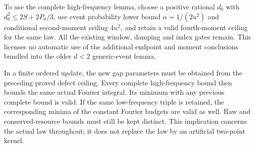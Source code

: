 To use the complete high-frequency lemma, choose a positive rational
$d_0$ with $d_0^2\le2S+2P_0/3$, use event probability lower bound
$\alpha=1/(2u^2)$ and conditional second-moment ceiling $4u^2$, and
retain a valid fourth-moment ceiling for the same law. All the existing
window, damping and index gates remain. This licenses no automatic use
of the additional endpoint and moment conclusions bundled into the
older $d<2$ generic-event lemma.

In a finite ordered update, the new gap parameters must be obtained from
the preceding proved defect ceiling. Every complete high-frequency bound
then bounds the same actual Fourier integral. Its minimum with any
previous complete bound is valid. If the same low-frequency triple is
retained, the corresponding minima of the constant Fourier budgets are
valid as well. Raw and conserved-resource bounds must still be kept
distinct. This implication concerns the actual law throughout; it does
not replace the law by an artificial two-point kernel.
